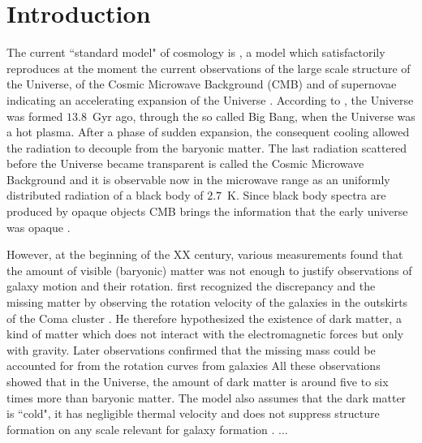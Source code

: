 
\chapter{Introduction}
\label{ch:introduction}

The current ``standard model" of cosmology is \lcdm{}, a model which satisfactorily reproduces at the moment the current observations of the large scale structure of the Universe, of the Cosmic Microwave Background (CMB) and of supernovae indicating an accelerating expansion of the Universe \citep{Riess1998}.
According to \lcdm{}, the Universe was formed $13.8$~Gyr ago, through the so called Big Bang, when the Universe was a hot plasma.
After a phase of sudden expansion, the consequent cooling allowed the radiation to decouple from the baryonic matter.
The last radiation scattered before the Universe became transparent is called the Cosmic Microwave Background and it is observable now in the microwave range as an uniformly distributed radiation of a black body of $2.7$~K.
Since black body spectra are produced by opaque objects CMB brings the information that the early universe was opaque \citep{Ryden2003}.


However, at the beginning of the XX century, various measurements found that the amount of visible (baryonic) matter was not enough to justify observations of galaxy motion and their rotation.
\citet{Zwicky1933} first recognized the discrepancy and the missing matter by observing the rotation velocity of the galaxies in the outskirts of the Coma cluster \citep{Zwicky1937}.
He therefore hypothesized the existence of dark matter, a kind of matter which does not interact with the electromagnetic forces but only with gravity.
Later observations confirmed that the missing mass could be accounted for from the rotation curves from galaxies %
All these observations showed that in the Universe, the amount of dark matter is around five to six times more than baryonic matter.
The \lcdm{} model also assumes that the dark matter is ``cold", \ie{} it has negligible thermal velocity and does not suppress structure formation on any scale relevant for galaxy formation \citep{Bullock2017}.
...


